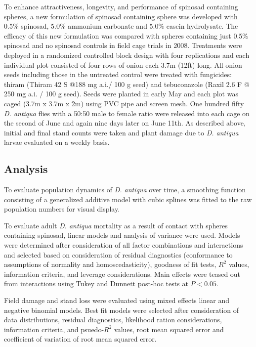 \documentclass[alpha-refs]{wiley-article}
\begin{document}
To enhance attractiveness, longevity, and performance of spinosad containing spheres, a new formulation of spinosad containing sphere was developed with 0.5\% spinosad, 5.0\% ammonium carbonate and 5.0\% casein hydrolysate. The efficacy of this new formulation was compared with spheres containing just 0.5\% spinosad and no spinosad controls in field cage trials in 2008. Treatments were deployed in a randomized controlled block design with four replications and each individual plot consisted of four rows of onion each 3.7m (12ft)  long. All onion seeds including those in the untreated control were treated with fungicides: thiram (Thiram 42 S {@}188 mg a.i./ 100 g seed) and tebuconazole (Raxil 2.6 F @ 250 mg a.i. / 100 g seed). Seeds were planted in early May and each plot was caged (3.7m x 3.7m x 2m) using PVC pipe and screen mesh. One hundred fifty \textit{D. antiqua} flies with a 50:50 male to female ratio were released into each cage on the second of June and again nine days later on June 11th. As described above, initial and final stand counts were taken and plant damage due to \textit{D. antiqua} larvae evaluated on a weekly basis.  


\subsection{Analysis}

To evaluate population dynamics of \textit{D. antiqua} over time, a smoothing function consisting of a generalized additive model with cubic splines was fitted to the raw population numbers for visual display.  

To evaluate adult \textit{D. antiqua} mortality as a result of contact with spheres containing spinosad, linear models and analysis of variance were used.  Models were determined after consideration of all factor combinations and interactions and selected based on consideration of residual diagnostics (conformance to assumptions of normality and homoscedasticity), goodness of fit tests, $R^2$ values, information criteria, and leverage considerations. Main effects were teased out from interactions using Tukey and Dunnett post-hoc tests at $P < 0.05$.  

Field damage and stand loss were evaluated using mixed effects linear and negative binomial models.  Best fit models were selected after consideration of data distributions, residual diagnostics, likelihood ration considerations, information criteria, and psuedo-$R^2$ values, root mean squared error and coefficient of variation of root mean squared error.  
\end{document}

